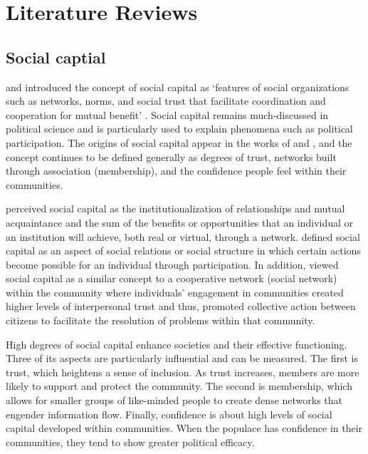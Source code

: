 \documentclass[12pt,]{article}
\begin{document}
\hypertarget{literature-reviews}{%
\section{Literature Reviews}\label{literature-reviews}}

\hypertarget{social-captial}{%
\subsection{Social captial}\label{social-captial}}

\citet{putnam1993a} and \citet{putnam2000a} introduced the concept of
social capital as `features of social organizations such as networks,
norms, and social trust that facilitate coordination and cooperation for
mutual benefit' \citep[65]{putnam2000a}. Social capital remains
much-discussed in political science and is particularly used to explain
phenomena such as political participation. The origins of social capital
appear in the works of \citet{bourdieu1986a} and \citet{coleman1988a},
and the concept continues to be defined generally as degrees of trust,
networks built through association (membership), and the confidence
people feel within their communities.

\citet{bourdieu1986a} perceived social capital as the
institutionalization of relationships and mutual acquaintance and the
sum of the benefits or opportunities that an individual or an
institution will achieve, both real or virtual, through a network.
\citet{coleman1988a} defined social capital as an aspect of social
relations or social structure in which certain actions become possible
for an individual through participation. In addition, \citet{brehm1997a}
viewed social capital as a similar concept to a cooperative network
(social network) within the community where individuals' engagement in
communities created higher levels of interpersonal trust and thus,
promoted collective action between citizens to facilitate the resolution
of problems within that community.

High degrees of social capital enhance societies and their effective
functioning. Three of its aspects are particularly influential and can
be measured. The first is trust, which heightens a sense of inclusion.
As trust increases, members are more likely to support and protect the
community. The second is membership, which allows for smaller groups of
like-minded people to create dense networks that engender information
flow. Finally, confidence is about high levels of social capital
developed within communities. When the populace has confidence in their
communities, they tend to show greater political efficacy.
\end{document}
